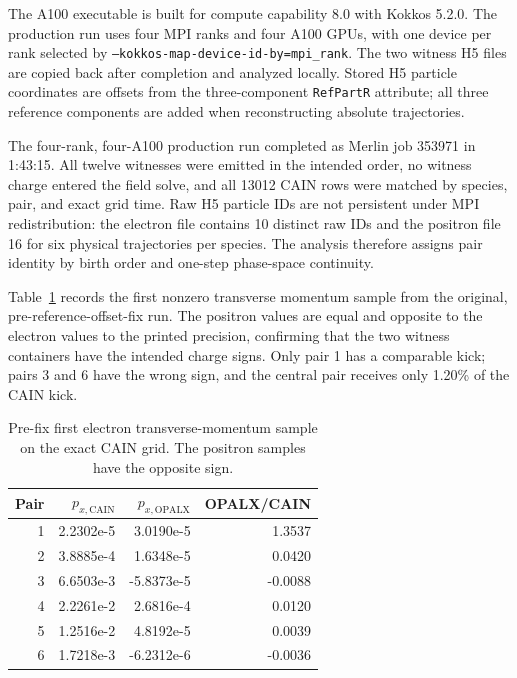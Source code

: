 \documentclass[11pt]{article}
\begin{document}
The A100 executable is built for compute capability 8.0 with Kokkos 5.2.0.
The production run uses four MPI ranks and four A100 GPUs, with one device per
rank selected by \texttt{--kokkos-map-device-id-by=mpi\_rank}.  The two witness
H5 files are copied back after completion and analyzed locally.  Stored H5
particle coordinates are offsets from the three-component \texttt{RefPartR}
attribute; all three reference components are added when reconstructing
absolute trajectories.

The four-rank, four-A100 production run completed as Merlin job 353971 in
1:43:15.  All twelve witnesses were emitted in the intended order, no witness
charge entered the field solve, and all 13012 CAIN rows were matched by
species, pair, and exact grid time.  Raw H5 particle IDs are not persistent
under MPI redistribution: the electron file contains 10 distinct raw IDs and
the positron file 16 for six physical trajectories per species.  The analysis
therefore assigns pair identity by birth order and one-step phase-space
continuity.

Table~\ref{tab:track12-first-kicks} records the first nonzero transverse
momentum sample from the original, pre-reference-offset-fix run.  The positron
values are equal and opposite to the electron values to the printed precision,
confirming that the two witness containers have the intended charge signs.
Only pair 1 has a comparable kick; pairs 3 and 6 have the wrong sign, and the
central pair receives only 1.20\% of the CAIN kick.

\begin{table}[htbp]
  \centering
  \begin{tabular}{rrrr}
    \hline
    Pair & $p_{x,\mathrm{CAIN}}$ & $p_{x,\mathrm{OPALX}}$
         & OPALX/CAIN \\
    \hline
    1 & 2.2302e-5 & 3.0190e-5  &  1.3537 \\
    2 & 3.8885e-4 & 1.6348e-5  &  0.0420 \\
    3 & 6.6503e-3 & -5.8373e-5 & -0.0088 \\
    4 & 2.2261e-2 & 2.6816e-4  &  0.0120 \\
    5 & 1.2516e-2 & 4.8192e-5  &  0.0039 \\
    6 & 1.7218e-3 & -6.2312e-6 & -0.0036 \\
    \hline
  \end{tabular}
  \caption{Pre-fix first electron transverse-momentum sample on the exact CAIN
  grid.  The positron samples have the opposite sign.}
  \label{tab:track12-first-kicks}
\end{table}
\end{document}
